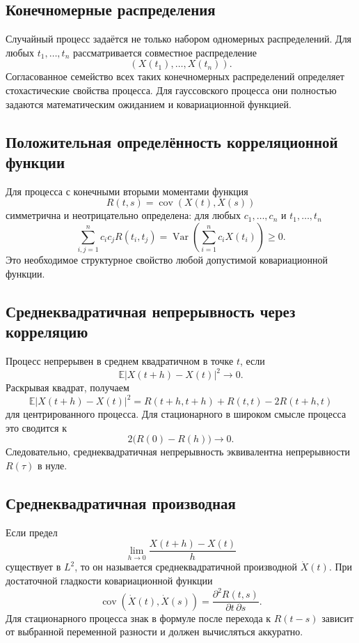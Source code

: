 \subsection{Конечномерные распределения}

Случайный процесс задаётся не только набором одномерных распределений. Для любых
$t_1,\ldots,t_n$ рассматривается совместное распределение
\[
    (X(t_1),\ldots,X(t_n)).
\]
Согласованное семейство всех таких конечномерных распределений определяет
стохастические свойства процесса. Для гауссовского процесса они полностью задаются
математическим ожиданием и ковариационной функцией.

\subsection{Положительная определённость корреляционной функции}

Для процесса с конечными вторыми моментами функция
\[
R(t,s)=\operatorname{cov}(X(t),X(s))
\]
симметрична и неотрицательно определена: для любых $c_1,\ldots,c_n$ и
$t_1,\ldots,t_n$
\[
    \sum_{i,j=1}^n c_ic_jR(t_i,t_j)
    =\operatorname{Var}\left(\sum_{i=1}^n c_iX(t_i)\right)\ge0.
\]
Это необходимое структурное свойство любой допустимой ковариационной функции.

\subsection{Среднеквадратичная непрерывность через корреляцию}

Процесс непрерывен в среднем квадратичном в точке $t$, если
\[
    \mathbb E|X(t+h)-X(t)|^2\to0.
\]
Раскрывая квадрат, получаем
\[
\mathbb E|X(t+h)-X(t)|^2
=R(t+h,t+h)+R(t,t)-2R(t+h,t)
\]
для центрированного процесса. Для стационарного в широком смысле процесса это
сводится к
\[
    2\bigl(R(0)-R(h)\bigr)\to0.
\]
Следовательно, среднеквадратичная непрерывность эквивалентна непрерывности
$R(\tau)$ в нуле.

\subsection{Среднеквадратичная производная}

Если предел
\[
    \lim_{h\to0}\frac{X(t+h)-X(t)}{h}
\]
существует в $L^2$, то он называется среднеквадратичной производной $\dot X(t)$.
При достаточной гладкости ковариационной функции
\[
    \operatorname{cov}(\dot X(t),\dot X(s))
    =\frac{\partial^2 R(t,s)}{\partial t\,\partial s}.
\]
Для стационарного процесса знак в формуле после перехода к $R(t-s)$ зависит от
выбранной переменной разности и должен вычисляться аккуратно.

